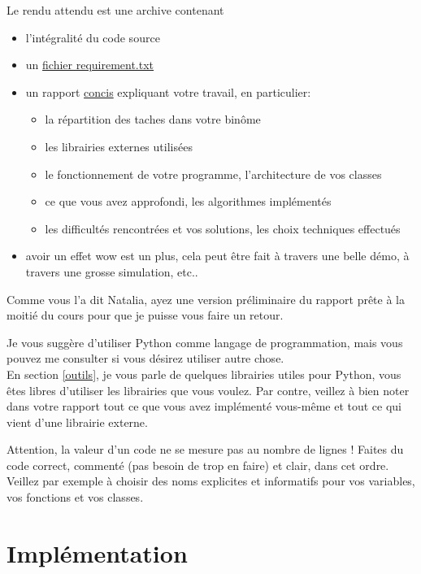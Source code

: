 \documentclass{article}
\begin{document}
\vspace{1em}

\noindent Le rendu attendu est une archive contenant
\begin{itemize}
    \item l'intégralité du code source
    \item un \href{https://pip.pypa.io/en/stable/user_guide/#requirements-files}{fichier requirement.txt}
    \item un rapport \underline{concis} expliquant votre travail, en particulier:
    \begin{itemize}
        \item la répartition des taches dans votre binôme
        \item les librairies externes utilisées
        \item le fonctionnement de votre programme, l'architecture de vos classes
        \item ce que vous avez approfondi, les algorithmes implémentés
        \item les difficultés rencontrées et vos solutions, les choix techniques effectués
    \end{itemize}
    \item avoir un \og effet wow \fg{} est un plus, cela peut être fait à travers une belle démo, à travers une grosse simulation, etc..
\end{itemize}
Comme vous l'a dit Natalia, ayez une version préliminaire du rapport prête à la moitié du cours pour que je puisse vous faire un retour.

\vspace{1em}

\noindent Je vous suggère d'utiliser Python comme langage de programmation, mais vous pouvez me consulter si vous désirez utiliser autre chose. \\
En section \ref{outils}, je vous parle de quelques librairies utiles pour Python, vous êtes libres d'utiliser les librairies que vous voulez. Par contre, veillez à bien noter dans votre rapport tout ce que vous avez implémenté vous-même et tout ce qui vient d'une librairie externe.

Attention, la valeur d'un code ne se mesure pas au nombre de lignes ! Faites du code correct, commenté (pas besoin de trop en faire) et clair, dans cet ordre. Veillez par exemple à choisir des noms explicites et informatifs pour vos variables, vos fonctions et vos classes.

\section{Implémentation}
\end{document}
